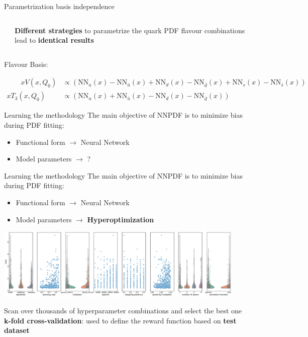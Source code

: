 \documentclass[aspectratio=169,9pt]{beamer}
\begin{document}
\begin{frame}{Parametrization basis independence}
\begin{columns}
{		    }
            \begin{block}{}
                \textbf{Different strategies} to parametrize the quark PDF flavour combinations lead to \textbf{identical results}
            \end{block}
    \end{columns}
    \vspace*{-0.5em}
    Flavour Basis:
    {\footnotesize
    \begin{fleqn}
    \begin{align*}
        \qquad x V\left(x, Q_{0}\right) &\propto\left(\mathrm{NN}_{u}(x)-\mathrm{NN}_{\bar{u}}(x)+\mathrm{NN}_{d}(x)-\mathrm{NN}_{\bar{d}}(x)+\mathrm{NN}_{s}(x)-\mathrm{NN}_{\bar{s}}(x)\right) \\
        x T_{3}\left(x, Q_{0}\right) &\propto\left(\mathrm{NN}_{u}(x)+\mathrm{NN}_{\bar{u}}(x)-\mathrm{NN}_{d}(x)-\mathrm{NN}_{\bar{d}}(x)\right)
    \end{align*}
    \end{fleqn}
    }
\end{frame}



\begin{frame}[t]{Learning the methodology}
	The main objective of NNPDF is to minimize bias during PDF fitting:
	\begin{itemize}
	    \item Functional form $\rightarrow$ Neural Network
	    \item Model parameters $\rightarrow$ ?
	\end{itemize}
\end{frame}


\begin{frame}[t]{Learning the methodology}
	The main objective of NNPDF is to minimize bias during PDF fitting:
	\begin{itemize}
	    \item Functional form $\rightarrow$ Neural Network
	    \item Model parameters $\rightarrow$ \textbf{Hyperoptimization}
	\end{itemize}
	\begin{center}
	    \includegraphics[width=0.9\textwidth]{hyperopt_scan}
	\end{center}
    Scan over thousands of hyperparameter combinations and select the best one \\
    {\bf k-fold cross-validation}: used to define the reward function based on {\bf test dataset}
\end{frame}
\end{document}
